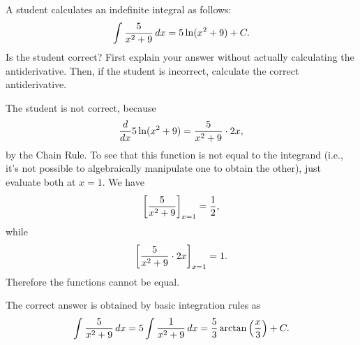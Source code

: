 \documentclass[]{ximera}
\begin{document}
\begin{problem}
A student calculates an indefinite integral as follows:
$$
\int \frac{5}{x^2 + 9} \mathop{}\!d x = 5\ln (x^2 + 9) + C.
$$
Is the student correct? First explain your answer without actually calculating the antiderivative. Then, if the student is incorrect, calculate the correct antiderivative.
\end{problem}

\begin{freeResponse} The student is not correct, because 
$$
\frac{\mathop{}\!d}{\mathop{}\!d x} 5 \ln (x^2 + 9) = \frac{5}{x^2 + 9} \cdot 2x,
$$
by the Chain Rule. To see that this function is not equal to the integrand (i.e., it's not possible to algebraically manipulate one to obtain the other), just evaluate both at $x=1$. We have 
$$
\bigg[ \frac{5}{x^2 + 9} \bigg]_{x=1} = \frac{1}{2},
$$
while 
$$
\bigg[ \frac{5}{x^2 + 9} \cdot 2x \bigg]_{x=1} = 1.
$$
Therefore the functions cannot be equal.

The correct answer is obtained by basic integration rules as
$$
\int \frac{5}{x^2 + 9} \mathop{}\!d x = 5 \int \frac{1}{x^2 + 9} \mathop{}\!d x = \frac{5}{3} \arctan \left(\frac{x}{3}\right) + C.
$$
\end{freeResponse}
\end{document}
